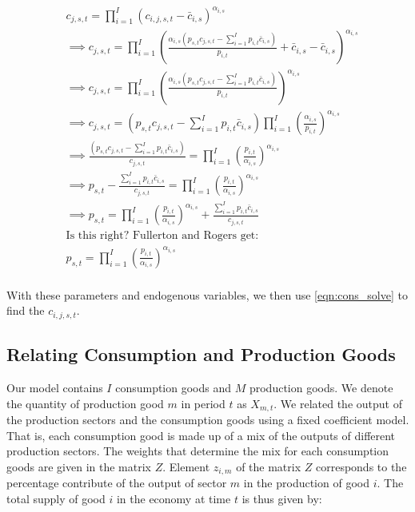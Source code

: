               \begin{equation} \label{eqn:composite_price}
      \begin{split}
      & c_{j,s,t} = \prod_{i=1}^{I}(c_{i,j,s,t}-\bar{c}_{i,s})^{\alpha_{i,s}} \\
      &\implies c_{j,s,t} = \prod_{i=1}^{I}\left( \frac{\alpha_{i,s} \left(p_{s,t}c_{j,s,t} - \sum_{i=1}^{I} p_{i,t}\bar{c}_{i,s}\right)}{p_{i,t}} + \bar{c}_{i,s}-\bar{c}_{i,s}\right)^{\alpha_{i,s}} \\
      &\implies c_{j,s,t} = \prod_{i=1}^{I}\left( \frac{\alpha_{i,s} \left(p_{s,t}c_{j,s,t} - \sum_{i=1}^{I} p_{i,t}\bar{c}_{i,s}\right)}{p_{i,t}} \right)^{\alpha_{i,s}} \\
      &\implies c_{j,s,t} =  \left(p_{s,t}c_{j,s,t} - \sum_{i=1}^{I} p_{i,t}\bar{c}_{i,s}\right) \prod_{i=1}^{I}\left( \frac{\alpha_{i,s}}{p_{i,t}} \right)^{\alpha_{i,s}} \\
      &\implies \frac{ \left(p_{s,t}c_{j,s,t} - \sum_{i=1}^{I} p_{i,t}\bar{c}_{i,s}\right)}{c_{j,s,t}} =  \prod_{i=1}^{I}\left( \frac{p_{i,t}}{\alpha_{i,s}} \right)^{\alpha_{i,s}} \\
       &\implies p_{s,t} -  \frac{\sum_{i=1}^{I} p_{i,t}\bar{c}_{i,s}}{c_{j,s,t}} =  \prod_{i=1}^{I}\left( \frac{p_{i,t}}{\alpha_{i,s}} \right)^{\alpha_{i,s}} \\
        &\implies p_{s,t}  =  \prod_{i=1}^{I}\left( \frac{p_{i,t}}{\alpha_{i,s}} \right)^{\alpha_{i,s}} + \frac{\sum_{i=1}^{I} p_{i,t}\bar{c}_{i,s}}{c_{j,s,t}}\\
        & \text{Is this right?  Fullerton and Rogers get:} \\
       &  p_{s,t}= \prod_{i=1}^{I}\left(\frac{p_{i,t}}{\alpha_{i,s}}\right)^{\alpha_{i,s}}\\
       \end{split}
    \end{equation}
    
    With these parameters and endogenous variables, we then use \ref{eqn:cons_solve} to find the $c_{i,j,s,t}$.
    
    \subsection{Relating Consumption and Production Goods}\label{sec:prod_cons_map}
    
    Our model contains $I$ consumption goods and $M$ production goods.  We denote the quantity of production good $m$ in period $t$ as $X_{m,t}$.  We related the output of the production sectors and the consumption goods using a fixed coefficient model. That is, each consumption good is made up of a mix of the outputs of different production sectors.  The weights that determine the mix for each consumption goods are given in the matrix $Z$.  Element $z_{i,m}$ of the matrix $Z$ corresponds to the percentage contribute of the output of sector $m$ in the production of good $i$.  The total supply of good $i$ in the economy at time $t$ is thus given by: 
    
